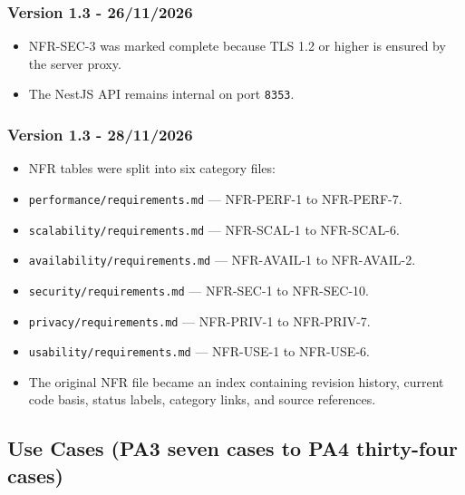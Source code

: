 \documentclass[12pt]{article}
\begin{document}
\hypertarget{sec:version-1-3-26-11-2026}{}
\subsubsection*{Version 1.3 - 26/11/2026}
\par\medskip

\begin{itemize}
\item NFR-SEC-3 was marked complete because TLS 1.2 or higher is ensured by the server proxy.
\item The NestJS API remains internal on port \texttt{8353}.
\end{itemize}
\par\medskip

\hypertarget{sec:version-1-3-28-11-2026}{}
\subsubsection*{Version 1.3 - 28/11/2026}
\par\medskip

\begin{itemize}
\item NFR tables were split into six category files:
\item \texttt{performance/requirements.md} --- NFR-PERF-1 to NFR-PERF-7.
\item \texttt{scalability/requirements.md} --- NFR-SCAL-1 to NFR-SCAL-6.
\item \texttt{availability/requirements.md} --- NFR-AVAIL-1 to NFR-AVAIL-2.
\item \texttt{security/requirements.md} --- NFR-SEC-1 to NFR-SEC-10.
\item \texttt{privacy/requirements.md} --- NFR-PRIV-1 to NFR-PRIV-7.
\item \texttt{usability/requirements.md} --- NFR-USE-1 to NFR-USE-6.
\item The original NFR file became an index containing revision history, current code basis, status labels, category links, and source references.
\end{itemize}
\par\medskip

\hypertarget{sec:use-cases-pa3-seven-cases-to-pa4-thirty-four-cases}{}
\subsection*{Use Cases (PA3 seven cases to PA4 thirty-four cases)}
\par\medskip
\end{document}

